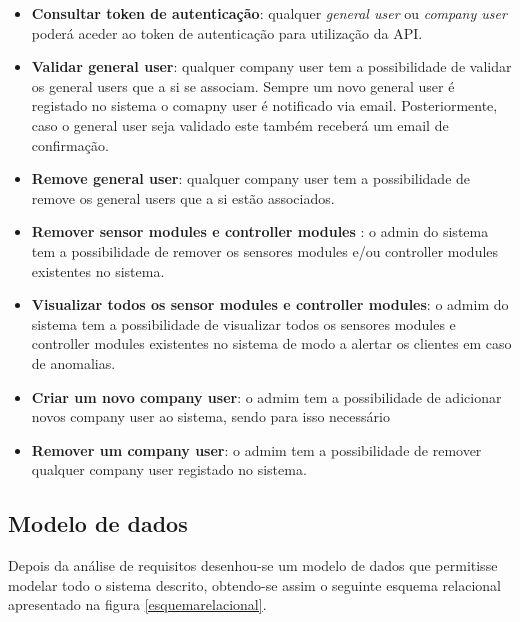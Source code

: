 \begin{itemize}
	\item \textbf{Consultar token de autenticação}: qualquer \textit{general user} ou \textit{company user} poderá aceder ao token de autenticação para utilização da API. 
	

	
	\item \textbf{Validar general user}: qualquer company user tem a possibilidade de validar os general users que a si se associam. Sempre um novo general user é registado no sistema o comapny user é notificado via email. Posteriormente, caso o general user seja validado este também receberá um email de confirmação.  
	
	\item \textbf{Remove general user}: qualquer company user tem a possibilidade de remove os general users que a si estão associados. 
	
	
	\item \textbf{Remover sensor modules e controller modules }: o admin do sistema tem a possibilidade de remover os sensores modules e/ou controller modules existentes no sistema. 
	
	
	\item \textbf{Visualizar todos os sensor modules e controller modules}: o admim do sistema tem a possibilidade de visualizar todos os sensores modules e controller modules existentes no sistema de modo a alertar os clientes em caso de anomalias. 
	
	
	\item \textbf{Criar um novo company user}: o admim tem a possibilidade de adicionar novos company user ao sistema, sendo para isso necessário 
	
	\item \textbf{Remover um company user}: o admim tem a possibilidade de remover qualquer company user registado no sistema.
	
	
\end{itemize}










\newpage
\subsection{Modelo de dados}

Depois da análise de requisitos desenhou-se um modelo de dados que permitisse modelar todo o sistema descrito, obtendo-se assim o seguinte esquema relacional apresentado na figura \ref{esquemarelacional}.





